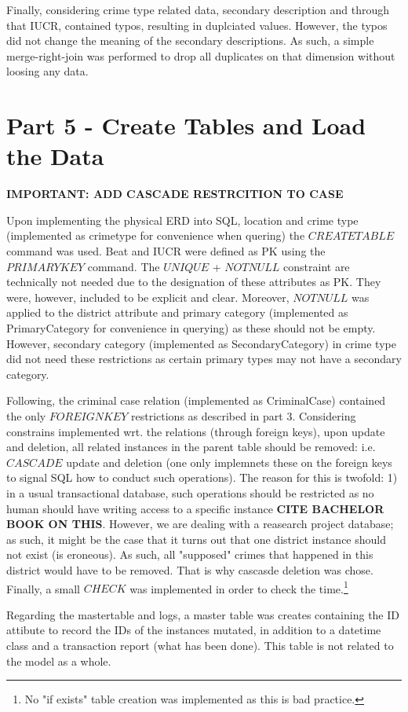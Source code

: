 \documentclass[a4paper]{article}
\begin{document}
Finally, considering crime type related data, secondary description and through that IUCR, contained typos, resulting in duplciated values. However, the typos did not change the meaning of the secondary descriptions. As such, a simple merge-right-join was performed to drop all duplicates on that dimension without loosing any data.

\section{Part 5 - Create Tables and Load the Data}
\textbf{IMPORTANT: ADD CASCADE RESTRCITION TO CASE}

Upon implementing the physical ERD into SQL, location and crime type (implemented as crimetype for convenience when quering) the $CREATE TABLE$ command was used. Beat and IUCR were defined as PK using the $PRIMARY KEY$ command. The $UNIQUE$ + $NOT NULL$ constraint are technically not needed due to the designation of these attributes as PK. They were, however, included to be explicit and clear. Moreover, $NOT NULL$ was applied to the district attribute and primary category (implemented as PrimaryCategory for convenience in querying) as these should not be empty. However, secondary category (implemented as SecondaryCategory) in crime type did not need these restrictions as certain primary types may not have a secondary category.

Following, the criminal case relation (implemented as CriminalCase) contained the only $FOREIGN KEY$ restrictions as described in part 3. Considering constrains implemented wrt. the relations (through foreign keys), upon update and deletion, all related instances in the parent table should be removed: i.e. $CASCADE$ update and deletion (one only implemnets these on the foreign keys to signal SQL how to conduct such operations). The reason for this is twofold: 1) in a usual transactional database, such operations should be restricted as no human should have writing access to a specific instance \textbf{CITE BACHELOR BOOK ON THIS}. However, we are dealing with a reasearch project database; as such, it might be the case that it turns out that one district instance should not exist (is eroneous). As such, all "supposed" crimes that happened in this district would have to be removed. That is why cascasde deletion was chose. Finally, a small $CHECK$ was implemented in order to check the time.\footnote{No "if exists" table creation was implemented as this is bad practice.}

Regarding the mastertable and logs, a master table was creates containing the ID attibute to record the IDs of the instances mutated, in addition to a datetime class and a transaction report (what has been done). This table is not related to the model as a whole.
\end{document}
